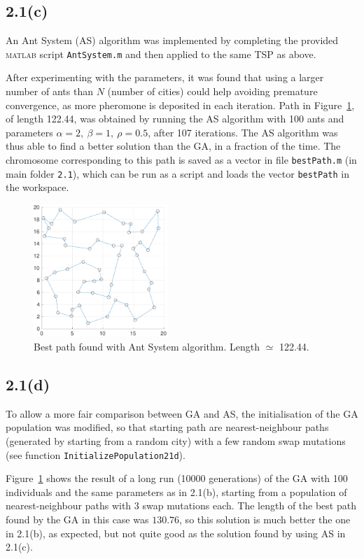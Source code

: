 \documentclass[12pt,titlepage]{article}
\begin{document}
\subsection*{2.1(c)}

An Ant System (AS) algorithm was implemented by completing the provided \textsc{matlab} script \texttt{AntSystem.m} and then applied to the same TSP as above. 

After experimenting with the parameters, it was found that using a larger number of ants than $N$ (number of cities) could help avoiding premature convergence, as more pheromone is deposited in each iteration. Path in Figure~\ref{fig:1c}, of length 122.44, was obtained by running the AS algorithm with 100 ants and parameters $\alpha = 2, \ \beta = 1, \ \rho = 0.5$, after 107 iterations. The AS algorithm was thus able to find a better solution than the GA, in a fraction of the time. The chromosome corresponding to this path is saved as a vector in file \texttt{bestPath.m} (in main folder \texttt{2.1}), which can be run as a script and loads the vector \texttt{bestPath} in the workspace.

\begin{figure}[htbp]
\centering
\includegraphics[width=0.45\textwidth]{Figures/2c_pathPlot}
\caption{Best path found with Ant System algorithm. Length $\simeq$ 122.44.}
\label{fig:1c}
\end{figure}

\subsection*{2.1(d)}
To allow a more fair comparison between GA and AS, the initialisation of the GA population was modified, so that starting path are nearest-neighbour paths (generated by starting from a random city) with a few random swap mutations (see function \texttt{InitializePopulation21d}).

Figure~\ref{fig:1c} shows the result of a long run (10000 generations) of the GA with 100 individuals and the same parameters as in 2.1(b), starting from a population of nearest-neighbour paths with 3 swap mutations each.
The length of the best path found by the GA in this case was $130.76$, so this solution is much better the one in 2.1(b), as expected, but not quite good as the solution found by using AS in 2.1(c).
\end{document}
